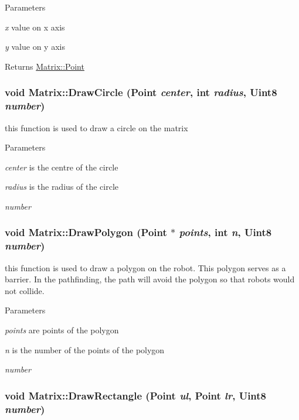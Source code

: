 \begin{DoxyParams}{Parameters}
\item[{\em x}]value on x axis \item[{\em y}]value on y axis \end{DoxyParams}
\begin{DoxyReturn}{Returns}
\hyperlink{structMatrix_1_1Point}{Matrix::Point} 
\end{DoxyReturn}
\hypertarget{classMatrix_a9dd7af97fcc825ca07a64b28050cb44f}{
\subsubsection[{DrawCircle}]{\setlength{\rightskip}{0pt plus 5cm}void Matrix::DrawCircle ({\bf Point} {\em center}, \/  int {\em radius}, \/  Uint8 {\em number})}}
\label{classMatrix_a9dd7af97fcc825ca07a64b28050cb44f}


this function is used to draw a circle on the matrix 


\begin{DoxyParams}{Parameters}
\item[{\em center}]is the centre of the circle \item[{\em radius}]is the radius of the circle \item[{\em number}]\end{DoxyParams}
\hypertarget{classMatrix_a3b2f9c59a4cc8da933de12f4ccb867f6}{
\subsubsection[{DrawPolygon}]{\setlength{\rightskip}{0pt plus 5cm}void Matrix::DrawPolygon ({\bf Point} $\ast$ {\em points}, \/  int {\em n}, \/  Uint8 {\em number})}}
\label{classMatrix_a3b2f9c59a4cc8da933de12f4ccb867f6}


this function is used to draw a polygon on the robot. This polygon serves as a barrier. In the pathfinding, the path will avoid the polygon so that robots would not collide. 


\begin{DoxyParams}{Parameters}
\item[{\em points}]are points of the polygon \item[{\em n}]is the number of the points of the polygon \item[{\em number}]\end{DoxyParams}
\hypertarget{classMatrix_a55977ba3ee91f352759f446a5092ea23}{
\subsubsection[{DrawRectangle}]{\setlength{\rightskip}{0pt plus 5cm}void Matrix::DrawRectangle ({\bf Point} {\em ul}, \/  {\bf Point} {\em lr}, \/  Uint8 {\em number})}}
\label{classMatrix_a55977ba3ee91f352759f446a5092ea23}


